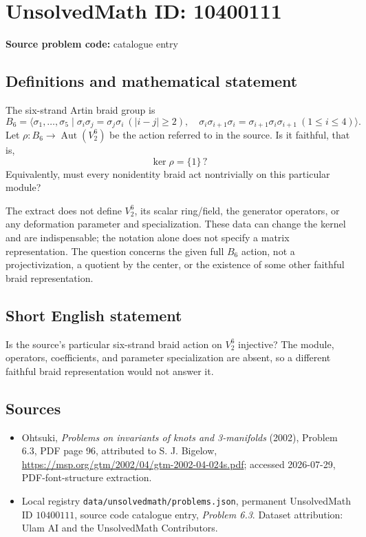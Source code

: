 \documentclass[11pt]{article}
\begin{document}
\section*{UnsolvedMath ID: 10400111}
\textbf{Source problem code:} catalogue entry
\subsection{Definitions and mathematical statement}
The six-strand Artin braid group is
\[
B_6=\langle\sigma_1,\ldots,\sigma_5\mid
\sigma_i\sigma_j=\sigma_j\sigma_i\ (|i-j|\geq2),\quad
\sigma_i\sigma_{i+1}\sigma_i=\sigma_{i+1}\sigma_i\sigma_{i+1}\ (1\leq i\leq4)\rangle.
\]
Let $\rho:B_6\to\operatorname{Aut}(V_2^6)$ be the action referred to in the source. Is it faithful, that is,
\[
\ker\rho=\{1\}\,?
\]
Equivalently, must every nonidentity braid act nontrivially on this particular module?

The extract does not define $V_2^6$, its scalar ring/field, the generator operators, or any deformation parameter and specialization. These data can change the kernel and are indispensable; the notation alone does not specify a matrix representation. The question concerns the given full $B_6$ action, not a projectivization, a quotient by the center, or the existence of some other faithful braid representation.
\subsection{Short English statement}
Is the source's particular six-strand braid action on $V_2^6$ injective? The module, operators, coefficients, and parameter specialization are absent, so a different faithful braid representation would not answer it.
\subsection{Sources}
\begin{itemize}
\item Ohtsuki, \emph{Problems on invariants of knots and 3-manifolds} (2002), Problem 6.3, PDF page 96, attributed to S. J. Bigelow, \url{https://msp.org/gtm/2002/04/gtm-2002-04-024s.pdf}; accessed 2026-07-29, PDF-font-structure extraction.
\item Local registry \texttt{data/unsolvedmath/problems.json}, permanent UnsolvedMath ID $10400111$, source code catalogue entry, \emph{Problem 6.3}. Dataset attribution: Ulam AI and the UnsolvedMath Contributors.
\end{itemize}
\end{document}
